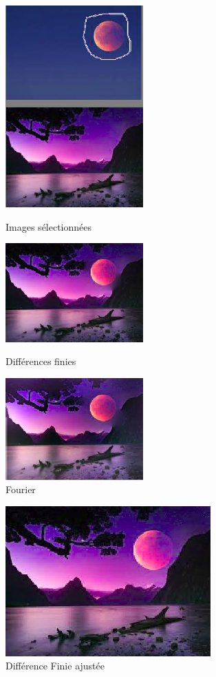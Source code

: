 \begin{figure}[!htb]
   \begin{minipage}{0.33\textwidth}
     \centering
     \includegraphics[width = 150pt]{Images/Resultats/LuneLand.png}
     \caption{Images sélectionnées}
      \end{minipage}\hfill
   \begin{minipage}{0.33\textwidth}
     \centering
     \includegraphics[width = 150pt]{Images/Resultats/LuneDF.png}
     \caption{Différences finies}
      \end{minipage}\hfill
   \begin{minipage}{0.33\textwidth}
     \centering
     \includegraphics[width= 150pt]{Images/Resultats/LuneFourier.png}
     \caption{Fourier}
   \end{minipage}
\end{figure}

\begin{figure}[!h]
\centering
\includegraphics[scale=0.5]{Images/Resultats/LuneDFChangeSel.png}
\caption{Différence Finie ajustée}
\end{figure}

